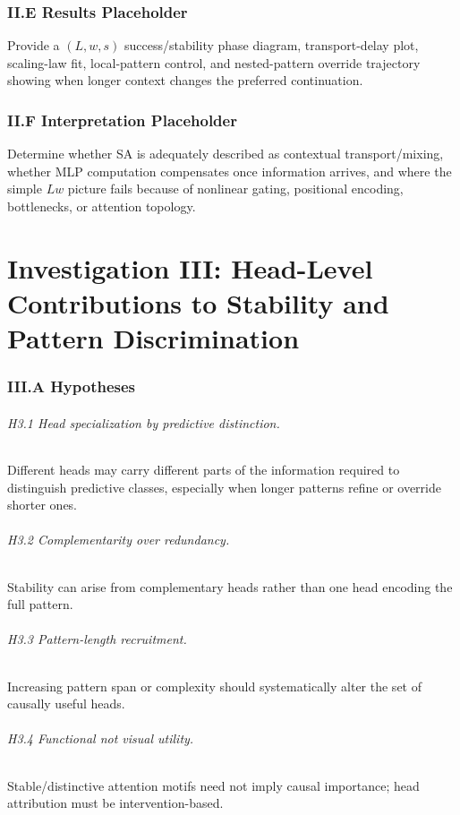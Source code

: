 \documentclass[10pt]{article}
\begin{document}
\section{II.E Results Placeholder}
Provide a $(L,w,s)$ success/stability phase diagram, transport-delay plot, scaling-law fit, local-pattern control, and nested-pattern override trajectory showing when longer context changes the preferred continuation.

\section{II.F Interpretation Placeholder}
Determine whether SA is adequately described as contextual transport/mixing, whether MLP computation compensates once information arrives, and where the simple $Lw$ picture fails because of nonlinear gating, positional encoding, bottlenecks, or attention topology.

\part{Investigation III: Head-Level Contributions to Stability and Pattern Discrimination}
\section{III.A Hypotheses}
\paragraph{H3.1 Head specialization by predictive distinction.} Different heads may carry different parts of the information required to distinguish predictive classes, especially when longer patterns refine or override shorter ones.
\paragraph{H3.2 Complementarity over redundancy.} Stability can arise from complementary heads rather than one head encoding the full pattern.
\paragraph{H3.3 Pattern-length recruitment.} Increasing pattern span or complexity should systematically alter the set of causally useful heads.
\paragraph{H3.4 Functional not visual utility.} Stable/distinctive attention motifs need not imply causal importance; head attribution must be intervention-based.
\end{document}
